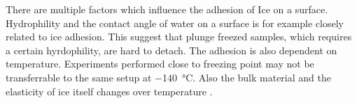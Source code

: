 There are multiple factors which influence the adhesion of Ice on a surface. Hydrophility and the contact angle of water on a surface is for example closely related to ice adhesion. This suggest that plunge freezed samples, which requires a certain hyrdophility, are hard to detach. The adhesion is also dependent on temperature. Experiments performed close to freezing point may not be transferrable to the same setup at \SI{-140}{\degreeCelsius}. Also the bulk material and the elasticity of ice itself changes over temperature \cite{Makkonen.2012}.
